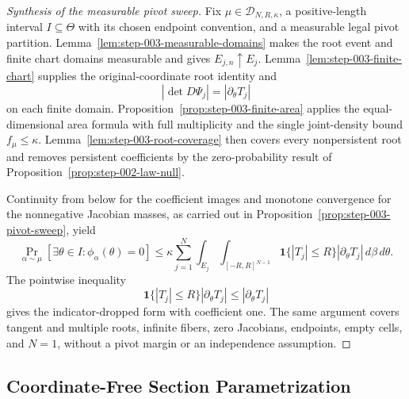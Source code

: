 \begin{proof}[Synthesis of the measurable pivot sweep]
Fix $\mu\in\mathcal D_{N,R,\kappa}$, a positive-length interval
$I\subseteq\Theta$ with its chosen endpoint convention, and a measurable
legal pivot partition.  Lemma~\ref{lem:step-003-measurable-domains} makes
the root event and finite chart domains measurable and gives
$E_{j,n}\uparrow E_j$.  Lemma~\ref{lem:step-003-finite-chart} supplies the
original-coordinate root identity and
\begin{equation}
\label{eq:appendix-display-104}
|\det D\Psi_j|=|\partial_\theta T_j|
\end{equation}
on each finite domain.  Proposition~\ref{prop:step-003-finite-area} applies
the equal-dimensional area formula with full multiplicity and the single
joint-density bound $f_\mu\leq\kappa$.  Lemma~\ref{lem:step-003-root-coverage}
then covers every nonpersistent root and removes persistent coefficients by
the zero-probability result of Proposition~\ref{prop:step-002-law-null}.

Continuity from below for the coefficient images and monotone convergence
for the nonnegative Jacobian masses, as carried out in
Proposition~\ref{prop:step-003-pivot-sweep}, yield
\begin{equation}
\label{eq:appendix-display-105}
\Pr_{\alpha\sim\mu}[\exists\theta\in I:\phi_\alpha(\theta)=0]
\leq
\kappa\sum_{j=1}^N\int_{E_j}\int_{[-R,R]^{N-1}}
\mathbf1\{|T_j|\leq R\}|\partial_\theta T_j|\,d\beta\,d\theta.
\end{equation}
The pointwise inequality
\begin{equation}
\label{eq:appendix-display-106}
\mathbf1\{|T_j|\leq R\}|\partial_\theta T_j|
\leq|\partial_\theta T_j|
\end{equation}
gives the indicator-dropped form with coefficient one.  The same argument
covers tangent and multiple roots, infinite fibers, zero Jacobians, endpoints,
empty cells, and $N=1$, without a pivot margin or an independence assumption.
\end{proof}

\subsection{Coordinate-Free Section Parametrization}\label{app:step-004}


